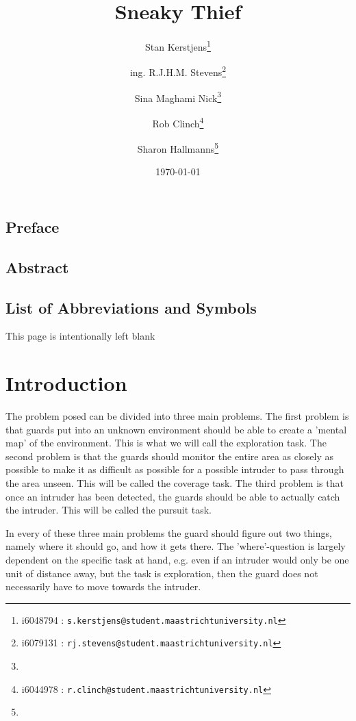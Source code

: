 \documentclass[a4paper]{report}
\title{Sneaky Thief}
\author{Stan Kerstjens\thanks{i6048794 : \texttt{s.kerstjens@student.maastrichtuniversity.nl}}}
\author{ing. R.J.H.M. Stevens\thanks{i6079131 : \texttt{rj.stevens@student.maastrichtuniversity.nl}}} %
\author{Sina Maghami Nick\thanks{}} %
\author{Rob Clinch\thanks{i6044978 :
\texttt{r.clinch@student.maastrichtuniversity.nl}}}
\author{Sharon Hallmanns\thanks{}} %
\affil{Department of Knowledge Engineering, Maastricht University}
\date{\today}
\begin{document}
\maketitle

\section*{Preface}
\section*{Abstract}
\listoffigures
\section*{List of Abbreviations and Symbols}
\tableofcontents\newpage



\newpage
\begin{center} 
	This page is intentionally left blank 
\end{center}

\newpage

\chapter{Introduction}




	The problem posed can be divided into three main problems. The first problem is that guards put into an unknown environment should be able to create a 'mental map' of the environment. This is what we will call the exploration task. The second problem is that the guards should monitor the entire area as closely as possible to make it as difficult as possible for a possible intruder to pass through the area unseen. This will be called the coverage task. The third problem is that once an intruder has been detected, the guards should be able to actually catch the intruder. This will be called the pursuit task.

	In every of these three main problems the guard should figure out two things, namely where it should go, and how it gets there. The 'where'-question is largely dependent on the specific task at hand, e.g. even if an intruder would only be one unit of distance away, but the task is exploration, then the guard does not necessarily have to move towards the intruder.
\end{document}

